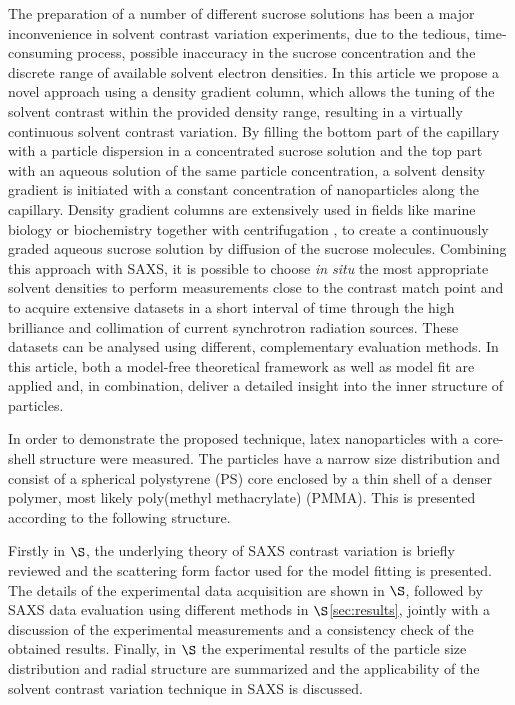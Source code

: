 The preparation of a number of different sucrose solutions has been a major inconvenience in solvent contrast variation experiments, due to the tedious, time-consuming process, possible inaccuracy in the sucrose concentration and the discrete range of available solvent electron densities. In this article we propose a novel approach using a density gradient column, which allows the tuning of the solvent contrast within the provided density range, resulting in a virtually continuous solvent contrast variation. By filling the bottom part of the capillary with a particle dispersion in a concentrated sucrose solution and the top part with an aqueous solution of the same particle concentration, a solvent density gradient is initiated with a constant concentration of nanoparticles along the capillary. Density gradient columns are extensively used in fields like marine biology \citet{Coombs1981} or biochemistry together with centrifugation \citet{Hinton1978}, to create a continuously graded aqueous sucrose solution by diffusion of the sucrose molecules. Combining this approach with SAXS, it is possible to choose \emph{in situ} the most appropriate solvent densities to perform measurements close to the contrast match point and to acquire extensive datasets in a short interval of time through the high brilliance and collimation of current synchrotron radiation sources. These datasets can be analysed using different, complementary evaluation methods. In this article, both a model-free theoretical framework as well as model fit are applied and, in combination, deliver a detailed insight into the inner structure of particles. 

In order to demonstrate the proposed technique, latex nanoparticles with a core-shell structure were measured. The particles have a narrow size distribution and consist of a spherical polystyrene (PS) core enclosed by a thin shell of a denser polymer, most likely poly(methyl methacrylate) (PMMA). This is presented according to the following structure. 

Firstly in \(\S\), the underlying theory of SAXS contrast variation is briefly reviewed and the scattering form factor used for the model fitting is presented. The details of the experimental data acquisition are shown in \(\S\), followed by SAXS data evaluation using different methods in \(\S\)\ref{sec:results}, jointly with a discussion of the experimental measurements and a consistency check of the obtained results. Finally, in \(\S\) the experimental results of the particle size distribution and radial structure are summarized and the applicability of the solvent contrast variation technique in SAXS is discussed.
